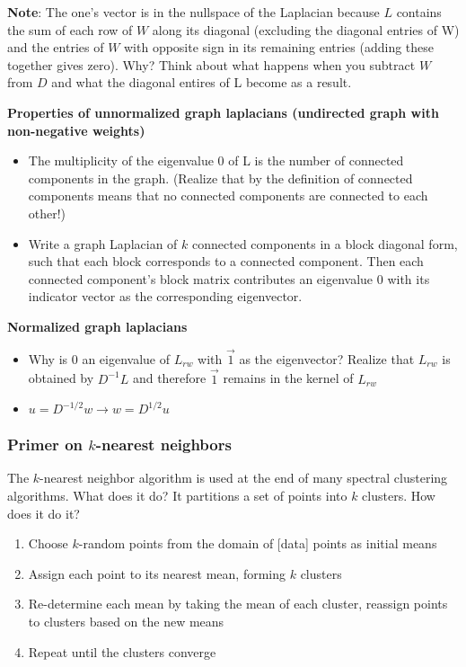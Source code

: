 \documentclass{article}
\begin{document}
        \textbf{Note}: The one's vector is in the nullspace of the Laplacian
because \ensuremath{L} contains the sum of each row of \ensuremath{W} along its
diagonal (excluding the diagonal entries of W) and the entries of \ensuremath{W}
with opposite sign in its remaining entries (adding these together gives zero).
Why? Think about what happens when you subtract \ensuremath{W} from
\ensuremath{D} and what the diagonal entires of L become as a result.

        \textbf{Properties of unnormalized graph laplacians (undirected graph
with non-negative weights)}
        \begin{itemize}
           \item The multiplicity of the eigenvalue 0 of L is the number of
connected components in the graph. (Realize that by the definition of connected
components means that
no connected components are connected to each other!)
            \item Write a graph Laplacian of \ensuremath{k} connected components
in a block diagonal form, such that each block corresponds to a connected
component. Then each connected component's block matrix contributes an
eigenvalue \ensuremath{0} with its indicator vector as the corresponding
eigenvector.
        \end{itemize}
        \textbf{Normalized graph laplacians}
        \begin{itemize}
        \item Why is \ensuremath{0} an eigenvalue of \ensuremath{L_{rw}}
with \ensuremath{\vec{1}} as the eigenvector? Realize that \ensuremath{L_{rw}}
is obtained by \ensuremath{D^{-1}L} and therefore \ensuremath{\vec{1}} remains
in the kernel of \ensuremath{L_{rw}}
        \item \ensuremath{u=D^{-1/2}w \rightarrow w = D^{1/2}u}
        \end{itemize} 

        \subsubsection{Primer on \ensuremath{k}-nearest neighbors}
        The \ensuremath{k}-nearest neighbor algorithm is used at the end of many
spectral clustering algorithms. What does it do? It partitions a set of points
into \ensuremath{k} clusters.
        How does it do it?
        \begin{enumerate}
        \item Choose \ensuremath{k}-random points from the domain of [data] points
as initial means 
        \item Assign each point to its nearest mean, forming \ensuremath{k}
clusters
        \item Re-determine each mean by taking the mean of each cluster,
reassign points to clusters based on the new means
        \item Repeat until the clusters converge
        \end{enumerate}
    
\end{document}
